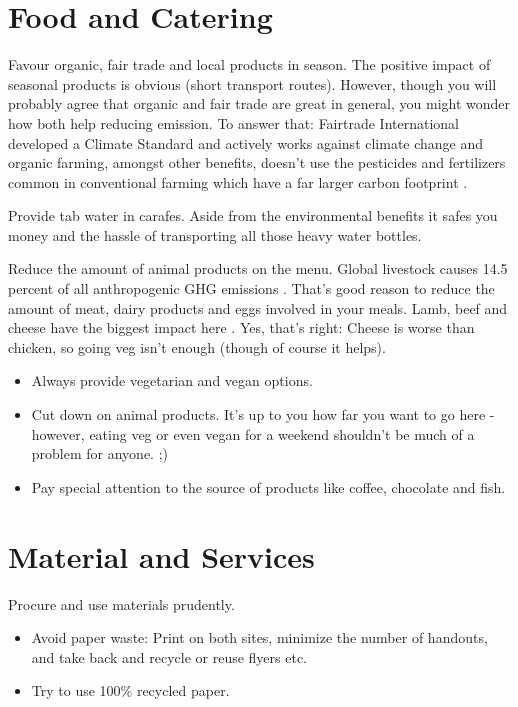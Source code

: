 \section{Food and Catering}

\begin{suggest}{Favour organic, fair trade and local products in season.}
	The positive impact of seasonal products is obvious (short transport routes). However, though you will probably agree that organic and fair trade are great in general, you might wonder how both help reducing emission. To answer that: Fairtrade International developed a Climate Standard and actively works against climate change \cite{fairtrade} and organic farming, amongst other benefits, doesn't use the pesticides and fertilizers common in conventional farming which have a far larger carbon footprint \cite{organic}.
\end{suggest}

\begin{suggest}{Provide tab water in carafes.}
	Aside from the environmental benefits it safes you money and the hassle of transporting all those heavy water bottles.
\end{suggest}

\begin{suggest}{Reduce the amount of animal products on the menu.}
	Global livestock causes 14.5 percent of all anthropogenic GHG emissions \cite{livestock}. That's good reason to reduce the amount of meat, dairy products and eggs involved in your meals. Lamb, beef and cheese have the biggest impact here \cite{animalGHG}. Yes, that's right: Cheese is worse than chicken, so going veg isn't enough (though of course it helps).
	\begin{itemize}
		\item Always provide vegetarian and vegan options.
		\item Cut down on animal products. It's up to you how far you want to go here - however, eating veg or even vegan for a weekend shouldn't be much of a problem for anyone. ;)
		\item Pay special attention to the source of products like coffee, chocolate and fish.
	\end{itemize}
\end{suggest}

\section{Material and Services}
\begin{suggest}{Procure and use materials prudently.}
	\vspace{-2\topsep}
	\begin{itemize}
	\item Avoid paper waste: Print on both sites, minimize the number of handouts, and take back and recycle or reuse flyers etc.
	\item Try to use 100\% recycled paper.
	\end{itemize}
\end{suggest}

